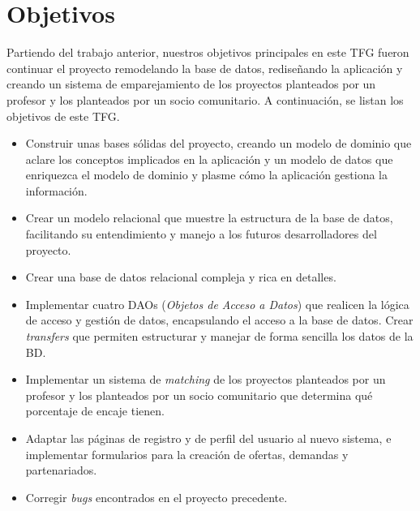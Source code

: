 \documentclass[11pt]{book}
\begin{document}
	\section{Objetivos}
	Partiendo del trabajo anterior, nuestros objetivos principales en este TFG fueron continuar el proyecto remodelando la base de datos, rediseñando la aplicación y creando un sistema de emparejamiento de los proyectos planteados por un profesor y los planteados por un socio comunitario.
	A continuación, se listan los objetivos de este TFG.
	\begin{itemize} 
		\item Construir unas bases sólidas del proyecto, creando un modelo de dominio que aclare los conceptos implicados en la aplicación y un modelo de datos que enriquezca el modelo de dominio y plasme cómo la aplicación gestiona la información.
		\item Crear un modelo relacional que muestre la estructura de la base de datos, facilitando su entendimiento y manejo a los futuros desarrolladores del proyecto.
		\item Crear una base de datos relacional compleja y rica en detalles.
		\item Implementar cuatro DAOs (\emph{Objetos de Acceso a Datos}) que realicen la lógica de acceso y gestión de datos, encapsulando el acceso a la base de datos. Crear \textit{transfers} que permiten estructurar y manejar de forma sencilla los datos de la BD.
		\item Implementar un sistema de \textit{matching} de los proyectos planteados por un profesor y los planteados por un socio comunitario que determina qué porcentaje de encaje tienen.
		\item Adaptar las páginas de registro y de perfil del usuario al nuevo sistema, e implementar formularios para la creación de ofertas, demandas y partenariados.
		\item Corregir \textit{bugs} encontrados en el proyecto precedente.
	\end{itemize}
\end{document}
